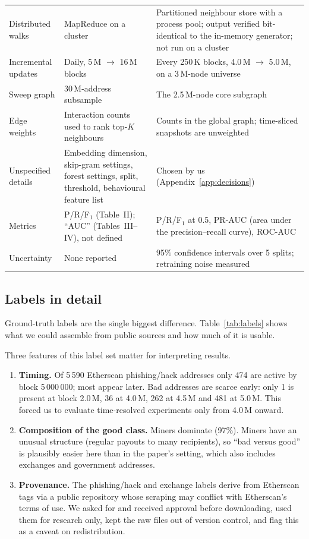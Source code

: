 {\begin{longtable}{p{2.7cm} p{5.4cm} p{6.0cm}}
Distributed walks & MapReduce on a cluster & Partitioned neighbour store with a process pool; output verified bit-identical to the in-memory generator; not run on a cluster\\
Incremental updates & Daily, 5\,M $\to$ 16\,M blocks & Every 250\,K blocks, 4.0\,M $\to$ 5.0\,M, on a 3\,M-node universe\\
Sweep graph & 30\,M-address subsample & The 2.5\,M-node core subgraph\\
Edge weights & Interaction counts used to rank top-$K$ neighbours & Counts in the global graph; time-sliced snapshots are unweighted\\
Unspecified details & Embedding dimension, skip-gram settings, forest settings, split, threshold, behavioural feature list & Chosen by us (Appendix~\ref{app:decisions})\\
Metrics & P/R/F$_1$ (Table~II); ``AUC'' (Tables~III--IV), not defined & P/R/F$_1$ at 0.5, PR-AUC (area under the precision--recall curve), ROC-AUC\\
Uncertainty & None reported & 95\% confidence intervals over 5 splits; retraining noise measured\\
\end{longtable}}

\subsection{Labels in detail}
Ground-truth labels are the single biggest difference. Table~\ref{tab:labels} shows what we could assemble from public sources and how much of it is usable.
\begin{table}[H]
\centering\small\singlespacing

\caption{Public label sources and how many labeled addresses exist in our graph.}
\label{tab:labels}
\end{table}
Three features of this label set matter for interpreting results.
\begin{enumerate}
\item \textbf{Timing.} Of 5\,590 Etherscan phishing/hack addresses only 474 are active by block 5\,000\,000; most appear later. Bad addresses are scarce early: only 1 is present at block 2.0\,M, 36 at 4.0\,M, 262 at 4.5\,M and 481 at 5.0\,M. This forced us to evaluate time-resolved experiments only from 4.0\,M onward.
\item \textbf{Composition of the good class.} Miners dominate (97\%). Miners have an unusual structure (regular payouts to many recipients), so ``bad versus good'' is plausibly easier here than in the paper's setting, which also includes exchanges and government addresses.
\item \textbf{Provenance.} The phishing/hack and exchange labels derive from Etherscan tags via a public repository whose scraping may conflict with Etherscan's terms of use. We asked for and received approval before downloading, used them for research only, kept the raw files out of version control, and flag this as a caveat on redistribution.
\end{enumerate}

